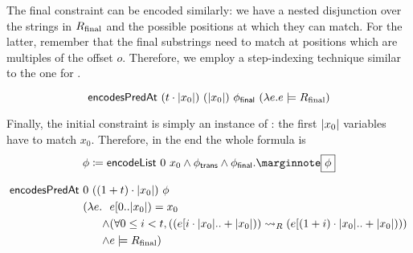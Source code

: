 
The final constraint can be encoded similarly: we have a nested disjunction over the strings in $R_{\text{final}}$ and the possible positions at which they can match. For the latter, remember that the final substrings need to match at positions which are multiples of the offset $o$. Therefore, we employ a step-indexing technique similar to the one for \encodeWindowsLine. 

\begin{lemma}
  \[\textsf{encodesPredAt}~(t \cdot |x_0|)~(|x_0|)~\phi_{\textsf{final}}~(\lambda e. e \models R_{\text{final}}) \]
\end{lemma}

Finally, the initial constraint is simply an instance of \encodeList: the first $|x_0|$ variables have to match $x_0$. 
Therefore, in the end the whole formula is
\[ \phi \defeq \encodeList~0~x_0 \land \phi_{\textsf{trans}} \land \phi_{\textsf{final}}.\mnote{$\phi$} \]

\begin{lemma}\label{lem:phi_correct}
  \begin{align*}
    \textsf{encodesPredAt}~&0~((1 +{t}) \cdot |x_0|)~\phi \\
                 &(\lambda e. \begin{aligned}[t]
                  &e[0..|x_0|) = x_0 \\
                   \land &  (\forall 0 \le i < t, ((e[i \cdot |x_0|..+|x_0|)) \rightsquigarrow_{R} (e[(1 +{i}) \cdot |x_0| ..+|x_0|))) \\
                  \land & e \models R_{\text{final}})
                \end{aligned}
  \end{align*}
\end{lemma}

